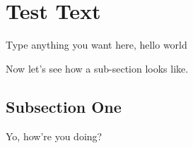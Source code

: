 
\section{Test Text}
\label{sec:text}



Type anything you want here, hello world

Now let's see how a sub-section looks like.

\subsection{Subsection One}

Yo, how're you doing?



 

